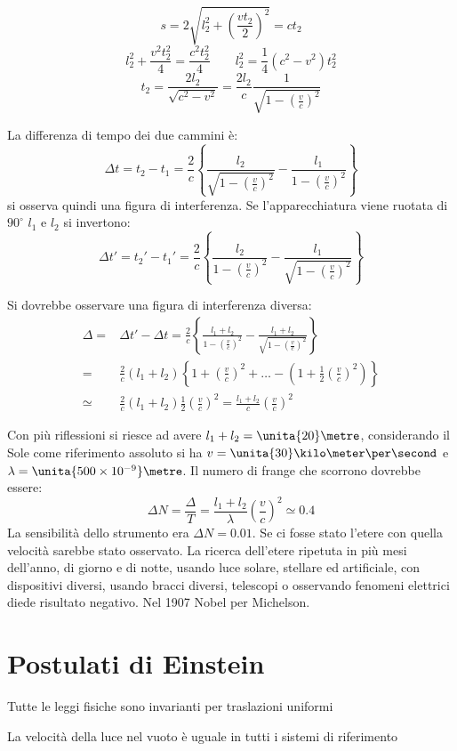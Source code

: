 \parbox[]{\textwidth}{
$$s=2\sqrt{l_2^2+\left(\frac{vt_2}{2}\right)^2}=ct_2$$
$$l_2^2+\frac{v^2t_2^2}{4}=\frac{c^2t_2^2}{4}\qquad l_2^2=\frac{1}{4}\left(c^2-v^2\right)t_2^2$$
$$t_2=\frac{2l_2}{\sqrt{c^2-v^2}}=\frac{2l_2}{c}\frac{1}{\sqrt{1-\left(\frac{v}{c}\right)^2}}$$
}
La differenza di tempo dei due cammini è:
$$\Delta t=t_2-t_1=\frac{2}{c}\left\{\frac{l_2}{\sqrt{1-\left(\frac{v}{c}\right)^2}}-\frac{l_1}{1-\left(\frac{v}{c}\right)^2}\right\}$$
si osserva quindi una figura di interferenza. Se l'apparecchiatura viene ruotata di $90^\circ$ $l_1$ e $l_2$ si invertono:
$$\Delta t'={t_2}'-{t_1}'=\frac{2}{c}\left\{\frac{l_2}{{1-\left(\frac{v}{c}\right)^2}}-\frac{l_1}{\sqrt{1-\left(\frac{v}{c}\right)^2}}\right\}$$

\parbox[]{\textwidth}{
Si dovrebbe osservare una figura di interferenza diversa:
\begin{align*}
\Delta=&\Delta t'-\Delta t=\frac{2}{c}\left\{\frac{l_1+l_2}{{1-\left(\frac{v}{c}\right)^2}}-\frac{l_1+l_2}{\sqrt{1-\left(\frac{v}{c}\right)^2}}\right\}\\
=&\frac{2}{c}(l_1+l_2)\left\{1+\left(\frac{v}{c}\right)^2+\ldots-\left(1+\frac{1}{2}\left(\frac{v}{c}\right)^2\right)\right\}\\
\simeq&\frac{2}{c}(l_1+l_2)\frac{1}{2}\left(\frac{v}{c}\right)^2=\frac{l_1+l_2}{c}\left(\frac{v}{c}\right)^2\end{align*}
}
Con più riflessioni si riesce ad avere $l_1+l_2=\unita{20}\metre$, considerando il Sole come riferimento assoluto si ha $v=\unita{30}\kilo\meter\per\second$ e $\lambda=\unita{500\times 10^{-9}}\metre$.
Il numero di frange che scorrono dovrebbe essere:
$$\Delta N=\frac{\Delta}{T}=\frac{l_1+l_2}{\lambda}\left(\frac{v}{c}\right)^2\simeq 0.4$$
La sensibilità dello strumento era $\Delta N=0.01$. Se ci fosse stato l'etere con quella velocità sarebbe stato osservato. La ricerca dell'etere ripetuta in più mesi dell'anno, di giorno e di notte, usando luce solare, stellare ed artificiale, con dispositivi diversi, usando bracci diversi, telescopi o osservando fenomeni elettrici diede risultato negativo. Nel 1907 Nobel per Michelson.
\section{Postulati di Einstein}
\begin{post}
Tutte le leggi fisiche sono invarianti per traslazioni uniformi
\end{post}
\begin{post}
La velocità della luce nel vuoto è uguale in tutti i sistemi di riferimento
\end{post}

